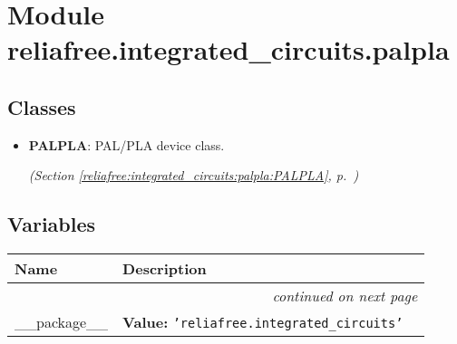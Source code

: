 %
%
%


\section{Module reliafree.integrated\_circuits.palpla}

    \label{reliafree:integrated_circuits:palpla}


\subsection{Classes}

\begin{itemize}  \setlength{\parskip}{0ex}
  \item \textbf{PALPLA}: PAL/PLA device class.



  \textit{(Section \ref{reliafree:integrated_circuits:palpla:PALPLA}, p.~\pageref{reliafree:integrated_circuits:palpla:PALPLA})}

\end{itemize}


  \subsection{Variables}

    \vspace{-1cm}
\hspace{\varindent}\begin{longtable}{|p{\varnamewidth}|p{\vardescrwidth}|l}
\cline{1-2}
\cline{1-2} \centering \textbf{Name} & \centering \textbf{Description}& \\
\cline{1-2}
\endhead\cline{1-2}\multicolumn{3}{r}{\small\textit{continued on next page}}\\\endfoot\cline{1-2}
\endlastfoot\raggedright \_\-\_\-p\-a\-c\-k\-a\-g\-e\-\_\-\_\- & \raggedright \textbf{Value:} 
{\tt \texttt{'}\texttt{reliafree.integrated\_circuits}\texttt{'}}&\\
\cline{1-2}
\end{longtable}

